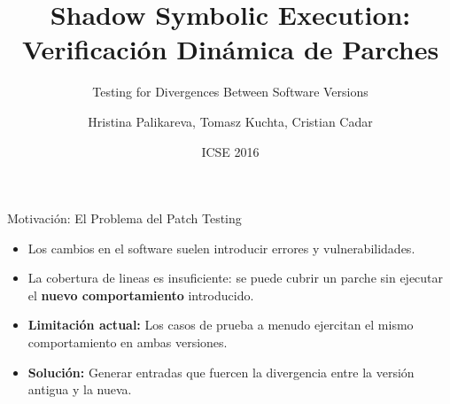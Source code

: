 \documentclass{beamer}
\title{Shadow Symbolic Execution: Verificación Dinámica de Parches}
\subtitle{Testing for Divergences Between Software Versions}
\author{Hristina Palikareva, Tomasz Kuchta, Cristian Cadar}
\institute{Imperial College London}
\date{ICSE 2016}
\begin{document}
\begin{frame}
\titlepage
\end{frame}

\begin{frame}{Motivación: El Problema del Patch Testing}
\begin{itemize}
    \item Los cambios en el software suelen introducir errores y vulnerabilidades.
    \item La cobertura de lineas es insuficiente: se puede cubrir un parche sin ejecutar el \textbf{nuevo comportamiento} introducido.
    \item \textbf{Limitación actual:} Los casos de prueba a menudo ejercitan el mismo comportamiento en ambas versiones.
    \item \textbf{Solución:} Generar entradas que fuercen la divergencia entre la versión antigua y la nueva.
\end{itemize}
\end{frame}
\end{document}
